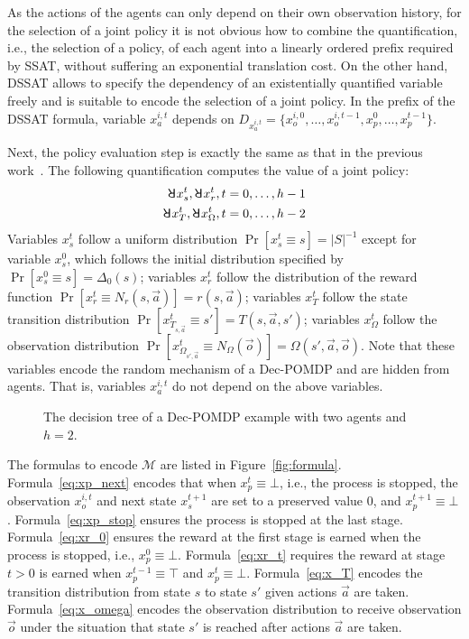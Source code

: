 As the actions of the agents can only depend on their own observation history, for the selection of a joint policy it is not obvious how to combine the quantification, i.e., the selection of a policy, of each agent into a linearly ordered prefix required by SSAT, without suffering an exponential translation cost.
On the other hand, DSSAT allows to specify the dependency of an existentially quantified variable freely and is suitable to encode the selection of a joint policy.
In the prefix of the DSSAT formula, variable $x_a^{i,t}$ depends on $D_{x_a^{i,t}}=\{x_o^{i,0},\ldots,x_o^{i,t-1},x_p^0,\ldots,x_p^{t-1}\}$.

Next, the policy evaluation step is exactly the same as that in the previous work~\cite{Salmon2020}.
The following quantification computes the value of a joint policy:
\begin{align*}
    \random{} x_s^t, \random{} x_r^t, t=0,\ldots,h-1 \\
    \random{} x_T^t, \random{} x_\Omega^t, t=0,\ldots,h-2
\end{align*}
Variables $x_s^t$ follow a uniform distribution $\Pr[x_s^t \equiv s]=|S|^{-1}$ except for variable $x_s^0$, which follows the initial distribution specified by $\Pr[x_s^0 \equiv s]=\Delta_0(s)$; variables $x_r^t$ follow the distribution of the reward function $\Pr[x_r^t \equiv N_r(s,\vec{a})]=r(s,\vec{a})$; variables $x_T^t$ follow the state transition distribution $\Pr[x_{T_{s,\vec{a}}}^t \equiv s']=T(s,\vec{a},s')$; variables $x_\Omega^t$ follow the observation distribution $\Pr[x_{\Omega_{s',\vec{a}}}^t \equiv N_\Omega(\vec{o})]=\Omega(s',\vec{a},\vec{o})$.
Note that these variables encode the random mechanism of a Dec-POMDP and are hidden from agents.
That is, variables $x_a^{i,t}$ do not depend on the above variables.

\begin{figure*}[t]
    \centering
    
    \caption{The decision tree of a Dec-POMDP example with two agents and $h=2$.}
    \label{fig:example}
    \vspace{-0.5cm}
\end{figure*}

The formulas to encode $\mathcal{M}$ are listed in Figure~\ref{fig:formula}.
Formula~\eqref{eq:xp_next} encodes that when $x_p^t \equiv \bot$, i.e., the process is stopped, the observation $x_o^{i,t}$ and next state $x_s^{t+1}$ are set to a preserved value $0$, and $x_p^{t+1} \equiv \bot$.
Formula~\eqref{eq:xp_stop} ensures the process is stopped at the last stage.
Formula~\eqref{eq:xr_0} ensures the reward at the first stage is earned when the process is stopped, i.e., $x_p^0 \equiv \bot$.
Formula~\eqref{eq:xr_t} requires the reward at stage $t>0$ is earned when $x_p^{t-1} \equiv \top$ and $x_p^t \equiv \bot$.
Formula~\eqref{eq:x_T} encodes the transition distribution from state $s$ to state $s'$ given actions $\vec{a}$ are taken.
Formula~\eqref{eq:x_omega} encodes the observation distribution to receive observation $\vec{o}$ under the situation that state $s'$ is reached after actions $\vec{a}$ are taken.

